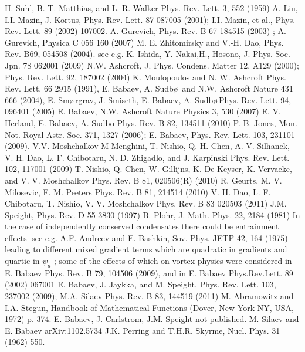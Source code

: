 \begin{thebibliography}{99}
     H. Suhl, B. T. Matthias, and L. R. Walker Phys. Rev. 
        Lett. 3, 552 (1959)
     A. Liu, I.I. Mazin, J. Kortus, Phys. Rev. Lett. 87 087005 
        (2001); I.I. Mazin, et al., Phys. Rev. Lett. 89 (2002) 107002.
     A. Gurevich, Phys. Rev. B 67 184515 (2003) ;
     A. Gurevich, Physica C 056 160 (2007)
     M. E. Zhitomirsky and V.-H. Dao, Phys. Rev. B69, 054508 
        (2004).
     see e.g. K. Ishida, Y. Nakai,H., Hosono, J. Phys. Soc. 
        Jpn. 78 062001 (2009)
     N.W. Ashcroft, J. Phys. Condens. Matter 12, A129 (2000); 
        Phys. Rev. Lett. 92, 187002 (2004) K. Moulopoulos and N. W. Ashcroft 
        Phys. Rev. Lett. 66 2915 (1991),
     E. Babaev, A. Sudb\o\,\! and N.W. Ashcroft Nature 431 666 
        (2004), E. Sm\o\,\!rgrav, J. Smiseth, E. Babaev, A. Sudb\o\,\!Phys. 
        Rev. Lett. 94, 096401 (2005) E. Babaev, N.W. Ashcroft Nature Physics 
        3, 530 (2007)
     E. V. Herland, E. Babaev, A. Sudbo Phys. Rev. B 82, 
        134511 (2010)
     P. B. Jones, Mon. Not. Royal Astr. Soc. 371, 1327 (2006); 
        E. Babaev, Phys. Rev. Lett. 103, 231101 (2009).
     V.V. Moshchalkov M Menghini, T. Nishio, Q. H. Chen, A. V. 
        Silhanek, V. H. Dao, L. F. Chibotaru, N. D. Zhigadlo, and J. Karpinski 
        Phys. Rev. Lett. 102, 117001 (2009)
     T. Nishio, Q. Chen, W. Gillijns, K. De Keyser, 
        K. Vervaeke, and V. V. Moshchalkov Phys. Rev. B 81, 020506(R) (2010)
     R. Geurts, M. V. Milosevic, F. M. Peeters Phys. Rev. 
        B 81, 214514 (2010) V. H. Dao, L. F. Chibotaru, T. Nishio, V. V. 
        Moshchalkov Phys. Rev. B 83 020503 (2011)
     J.M. Speight, Phys. Rev. D 55 3830 (1997)
     B. Plohr, J. Math. Phys. 22, 2184 (1981)
     In the case of independently conserved condensates there 
        could be entrainment effects [see e.g. A.F. Andreev and E. Bashkin, 
        Sov. Phys. JETP 42, 164 (1975) leading to different mixed gradient 
        terms which are quadratic in gradients and quartic in \( \psi_a \) ; 
        some of the effects of which on vortex physics were considered in 
        E. Babaev Phys. Rev. B 79, 104506 (2009), and in\cite{bib:14}
     E. Babaev Phys.Rev.Lett. 89 (2002) 067001 E. Babaev, 
        J. Jaykka, and M. Speight, Phys. Rev. Lett. 103, 237002 (2009); 
        M.A. Silaev Phys. Rev. B 83, 144519 (2011)
     M. Abramowitz and I.A. Stegun, Handbook of Mathematical 
        Functions (Dover, New York NY, USA, 1972) p. 374.
     E. Babaev, J. Carlstrom, J.M. Speight not published.
     M. Silaev and E. Babaev arXiv:1102.5734
     J.K. Perring and T.H.R. Skyrme, Nucl. Phys. 31 (1962) 550.
\end{thebibliography}
